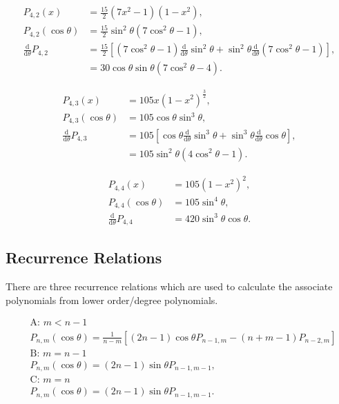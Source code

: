 \documentclass[]{article}
\begin{document}
	\begin{align}
		P_{4,2} (x) &= \frac{15}{2}(7x^2 - 1) (1-x^2), \\
		P_{4,2} (\cos{\theta}) &= \frac{15}{2} \sin^2{\theta}(7\cos^2{\theta} - 1), \\
		\frac{\text{d}}{\text{d} \theta} P_{4,2} &= \frac{15}{2}\left[(7\cos^2{\theta} - 1)\frac{\text{d}}{\text{d}\theta}\sin^2{\theta} + \sin^2{\theta} \frac{\text{d}}{\text{d}\theta}(7\cos^2{\theta} - 1)\right], \\
		&= 30\cos{\theta}\sin{\theta}(7\cos^2{\theta} - 4).
	\end{align}

	\begin{align}
		P_{4,3} (x) &= 105x(1-x^2)^\frac{3}{2}, \\
		P_{4,3} (\cos{\theta}) &= 105 \cos{\theta}\sin^3{\theta}, \\
		\frac{\text{d}}{\text{d} \theta} P_{4,3} &= 105\left[\cos{\theta}\frac{\text{d}}{\text{d}\theta}\sin^3{\theta} + \sin^3{\theta}\frac{\text{d}}{\text{d}\theta}\cos{\theta}\right], \\
		&= 105 \sin^2{\theta}(4\cos^2{\theta} - 1).
	\end{align}	

	\begin{align}
		P_{4,4} (x) &= 105(1-x^2)^2, \\
		P_{4,4} (\cos{\theta}) &= 105 \sin^4{\theta}, \\
		\frac{\text{d}}{\text{d} \theta} P_{4,4} &= 420 \sin^3{\theta} \cos{\theta}.
	\end{align}	
	
	\subsection{Recurrence Relations}
	
		There are three recurrence relations which are used to calculate the associate polynomials from lower order/degree polynomials. 
		
		\begin{align}
			&\text{A: }  m < n-1  \nonumber \\ 
			&P_{n,m} (\cos{\theta}) = \frac{1}{n-m} \left[(2n-1)\cos{\theta} P_{n-1,m} - (n + m -1)P_{n-2,m}\right] \\
			&\text{B: }  m = n-1  \nonumber \\ 
			&P_{n,m} (\cos{\theta}) = (2n-1)\sin{\theta} P_{n-1,m-1}, \\
			&\text{C: }  m = n  \nonumber \\ 
			&P_{n,m} (\cos{\theta}) = (2n-1)\sin{\theta} P_{n-1,m-1}.
		\end{align}
		
\end{document}
